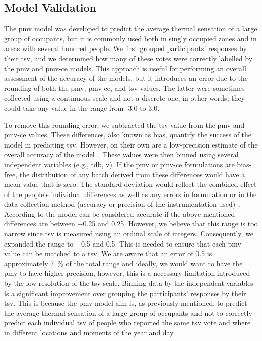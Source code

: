 \subsection{Model Validation}\label{subsec:model-validation}
The \ac{pmv} model was developed to predict the average thermal sensation of a large group of occupants, but it is commonly used both in singly occupied zones and in areas with several hundred people.
We first grouped participants' responses by their \ac{tsv}, and we determined how many of these votes were correctly labelled by the \ac{pmv} and \ac{pmv-ce} models.
This approach is useful for performing an overall assessment of the accuracy of the models, but it introduces an error due to the rounding of both the \ac{pmv}, \ac{pmv-ce}, and \ac{tsv} values.
The latter were sometimes collected using a continuous scale and not a discrete one, in other words, they could take any value in the range from -3.0 to 3.0.

To remove this rounding error, we subtracted the \ac{tsv} value from the \ac{pmv} and \ac{pmv-ce} values.
These differences, also known as bias, quantify the success of the model in predicting \ac{tsv}.
However, on their own are a low-precision estimate of the overall accuracy of the model~\cite{Humphreys2002}.
These values were then binned using several independent variables (e.g., \ac{tdb}, \ac{v}).
If the \ac{pmv} or \ac{pmv-ce} formulations are bias-free, the distribution of any batch derived from these differences would have a mean value that is zero.
The standard deviation would reflect the combined effect of the people's individual differences as well as any errors in formulation or in the data collection method (accuracy or precision of the instrumentation used)~\cite{Humphreys2002}.
According to  the model can be considered accurate if the above-mentioned differences are between \num{-0.25} and \num{0.25}.
However, we believe that this range is too narrow since \ac{tsv} is measured using an ordinal scale of integers.
Consequently, we expanded the range to \num{-.5} and \num{0.5}.
This is needed to ensure that each \ac{pmv} value can be matched to a \ac{tsv}.
We are aware that an error of \num{.5} is approximately \qty{7}{\percent} of the total range and ideally, we would want to have the \ac{pmv} to have higher precision, however, this is a necessary limitation introduced by the low resolution of the \ac{tsv} scale.
Binning data by the independent variables is a significant improvement over grouping the participants' responses by their \ac{tsv}.
This is because the \ac{pmv} model aim is, as previously mentioned, to predict the average thermal sensation of a large group of occupants and not to correctly predict each individual \ac{tsv} of people who reported the same \ac{tsv} vote and where in different locations and moments of the year and day.

